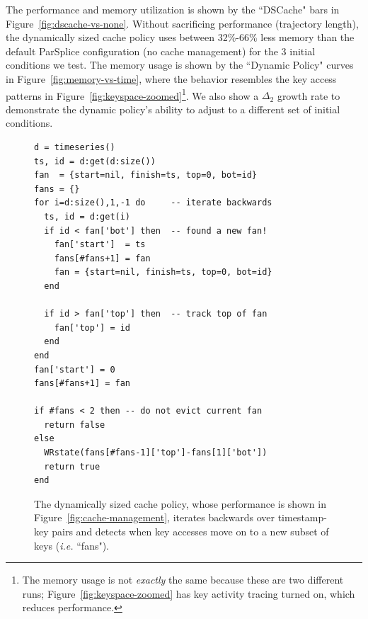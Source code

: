 The performance and memory utilization is shown by the ``DSCache" bars in
Figure~\ref{fig:dscache-vs-none}. Without sacrificing performance (trajectory
length), the dynamically sized cache policy uses between 32\%-66\% less memory
than the default ParSplice configuration (no cache management) for the 3
initial conditions we test. The memory usage is shown by the ``Dynamic Policy"
curves in Figure~\ref{fig:memory-vs-time}, where the behavior resembles the key
access patterns in Figure~\ref{fig:keyspace-zoomed}\footnote{The memory usage
is not {\it exactly} the same because these are two different runs;
Figure~\ref{fig:keyspace-zoomed} has key activity tracing turned on, which
reduces performance.}.  We also show a \(\Delta_2\) growth rate to demonstrate
the dynamic policy's ability to adjust to a different set of initial
conditions.

\begin{figure}[h]
\footnotesize
\begin{verbatim}
d = timeseries()
ts, id = d:get(d:size())
fan  = {start=nil, finish=ts, top=0, bot=id}
fans = {}
for i=d:size(),1,-1 do     -- iterate backwards
  ts, id = d:get(i)
  if id < fan['bot'] then  -- found a new fan!
    fan['start']  = ts
    fans[#fans+1] = fan 
    fan = {start=nil, finish=ts, top=0, bot=id}
  end 

  if id > fan['top'] then  -- track top of fan
    fan['top'] = id 
  end 
end
fan['start'] = 0 
fans[#fans+1] = fan 

if #fans < 2 then -- do not evict current fan
  return false 
else
  WRstate(fans[#fans-1]['top']-fans[1]['bot'])
  return true
end
\end{verbatim}
\caption{The dynamically sized cache policy, whose performance is shown in 
Figure~\ref{fig:cache-management}, iterates backwards over timestamp-key pairs
and detects when key accesses move on to a new subset of
keys ({\it i.e.} ``fans"). \label{src:dyn-cache}}
\end{figure}
